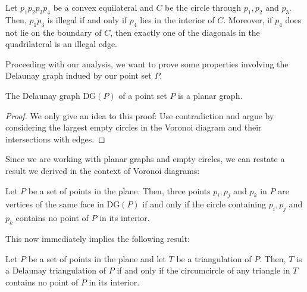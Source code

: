     \begin{theorem}
        \label{lma:illegal_edge_detection}
        Let $p_1p_2p_3p_4$ be a convex equilateral and $C$ be the circle through $p_1, p_2$ and $p_3$. Then, $\overline{p_1p_3}$ is illegal if and only if $p_4$ lies in the interior of $C$\footnotemark{}. Moreover, if $p_4$ does not lie on the boundary of $C$, then exactly one of the diagonals in the quadrilateral is an illegal edge. 
    \end{theorem}

    Proceeding with our analysis, we want to prove some properties involving the Delaunay graph indued by our point set $P$.

    \begin{lemma} 
        The Delaunay graph $\text{DG}(P)$ of a point set $P$ is a planar graph.
    \end{lemma}
    \begin{proof} 
        We only give an idea to this proof: Use contradiction and argue by considering the largest empty circles in the Voronoi diagram and their intersections with edges.
    \end{proof}

    Since we are working with planar graphs and empty circles, we can restate a result we derived in the context of Voronoi diagrams:

    \begin{lemma} 
        Let $P$ be a set of points in the plane. Then, three points $p_i, p_j$ and $p_k$ in $P$ are vertices of the same face in $\text{DG}(P)$ if and only if the circle containing $p_i, p_j$ and $p_k$ contains no point of $P$ in its interior.
    \end{lemma}

    This now immediately implies the following result:

    \begin{theorem}
        Let $P$ be a set of points in the plane and let $T$ be a triangulation of $P$. Then, $T$ is a Delaunay triangulation of $P$ if and only if the circumcircle of any triangle in $T$ contains no point of $P$ in its interior. 
    \end{theorem}

